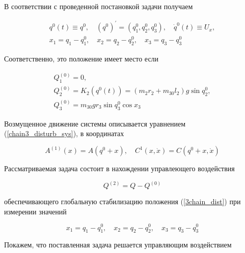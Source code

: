   В соответствии с проведенной постановкой задачи получаем
  
  \begin{equation}
  \begin{array}{l}
   q^{0}(t) \equiv q^{0}, \quad (q^{0})^{'} = (q_1^0, q_2^0, q_3^0), \quad \dot q^{0}(t) \equiv U_x, \\
   x_1 = q_1 - q_1^0, \quad x_2 = q_2 - q_2^0, \quad x_3 = q_3 - q_3^0 \label{3chain_dist}
   \end{array}
   \end{equation}
   
   Соответственно, это положение имеет место если
   
    \begin{equation}
     \begin{array}{l}
     Q_1^{(0)} = 0, \\
     Q_2^{(0)} = K_2(q^0(t)) = (m_2 r_2 + m_{30} l_2)g \sin q_2^0, \\
     Q_3^{(0)} = m_{30} g r_3 \sin q_3^0 \cos x_3 \label{chain3_control_functions}
     \end{array}
    \end{equation}
    
  Возмущенное движение системы описывается уравнением (\ref{chain3_disturb_sys}), в координатах
  
     \begin{equation}
      A^{(1)}(x) = A(q^0 + x), \quad C^1(x, \dot x) = C(q^0 + x, \dot x)
     \end{equation}
     
  Рассматриваемая задача состоит в нахождении управлеющего воздействия
  
     \begin{equation*}
      Q^{(2)} = Q - Q^{(0)}
     \end{equation*}
     
  обеспечивающего глобальную стабилизацию положения (\ref{3chain_dist}) при измерении значений
  
     \begin{equation*}
     x_1 = q_1 - q_1^0, \quad x_2 = q_2 - q_2^0, \quad x_3 = q_3 - q_3^0
     \end{equation*}
     
  Покажем, что поставленная задача решается управляющим воздействием
  
